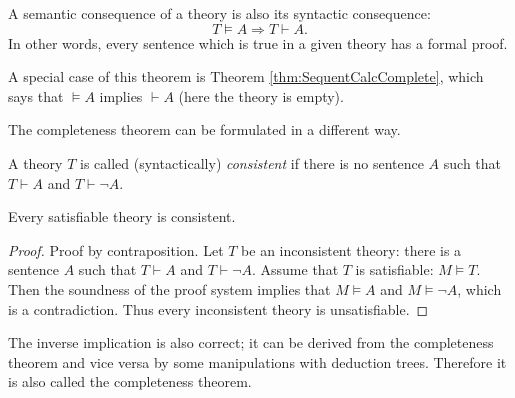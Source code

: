 \begin{page}

\begin{thm}
\label{thm:Complete1}
A semantic consequence of a theory is also its syntactic consequence:
\[
T \vDash A \Rightarrow T \vdash A.
\]
In other words, every sentence which is true in a given theory has a formal proof.
\end{thm}

\end{page}

\begin{page}


A special case of this theorem is Theorem \ref{thm:SequentCalcComplete}, which says that $\vDash A$ implies $\vdash A$
(here the theory is empty).


The completeness theorem can be formulated in a different way.


\end{page}

\begin{page}

\begin{dfn}
A theory $T$ is called (syntactically) \emph{consistent} if there is no sentence $A$ such that $T \vdash A$ and $T \vdash \neg A$.
\end{dfn}

\end{page}

\begin{page}

\begin{lem}
\label{lem:SatConsist}
Every satisfiable theory is consistent.
\end{lem}

\end{page}

\begin{page}

\begin{proof}
Proof by contraposition.
Let $T$ be an inconsistent theory: there is a sentence $A$ such that $T \vdash A$ and $T \vdash \neg A$.
Assume that $T$ is satisfiable: $M \vDash T$.
Then the soundness of the proof system implies that $M \vDash A$ and $M \vDash \neg A$, which is a contradiction.
Thus every inconsistent theory is unsatisfiable.
\end{proof}

The inverse implication is also correct; it can be derived from the completeness theorem and vice versa by some manipulations with deduction trees.
Therefore it is also called the completeness theorem.


\end{page}

